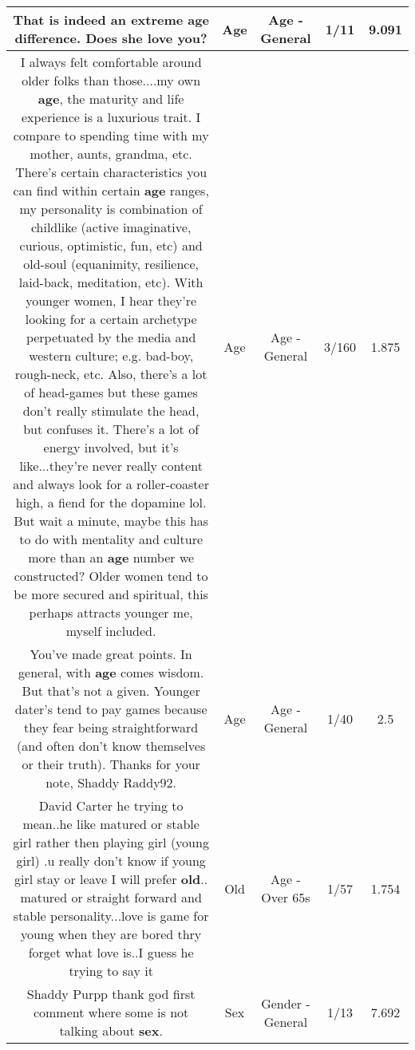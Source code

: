 \documentclass[11pt]{article}
\newlength\mylength
\begin{document}
\begin{center}
\begin{longtable}{|C{.65\mylength}|C{.30\mylength}|C{.12\mylength}|C{.12\mylength}|C{.12\mylength}|}
  \small That is indeed an extreme \textbf{age} difference. Does she love you?\normalsize   & Age & Age - General & 1/11 & 9.091 \\  \hline
  \small I always felt comfortable around older folks than those....my own \textbf{age}, the maturity and life experience is a luxurious trait. I compare to spending time with my mother,  aunts, grandma, etc. There's certain characteristics you can find within certain \textbf{age} ranges, my personality is combination of childlike (active imaginative, curious, optimistic, fun, etc) and old-soul (equanimity, resilience, laid-back,  meditation, etc). With younger women, I hear they're looking for a certain archetype perpetuated by the media and western culture; e.g. bad-boy, rough-neck, etc. Also, there's a lot of head-games but these games don't really stimulate the head, but confuses it. There's a lot of energy involved, but it's like...they're never really content and always look for a roller-coaster high, a fiend for the dopamine lol. But wait a minute, maybe this has to do with mentality and culture more than an \textbf{age} number we constructed? Older women tend to be more secured and spiritual, this perhaps attracts younger me, myself included.\normalsize   & Age & Age - General & 3/160 & 1.875 \\  \hline
  \small You've made great points. In general, with \textbf{age} comes wisdom. But that's not a given. Younger dater's tend to pay games because they fear being straightforward (and often don't know themselves or their truth). Thanks for your note, Shaddy Raddy92.\normalsize   & Age & Age - General & 1/40 & 2.5 \\  \hline
  \small David Carter he trying to mean..he like matured or stable girl rather then playing girl (young girl) .u really don't know if young girl stay or leave I will prefer \textbf{old}.. matured or straight forward and stable personality...love is game for young when they are bored thry forget what love is..I guess he trying to say it\normalsize   & Old & Age - Over 65s & 1/57 & 1.754 \\  \hline
  \small Shaddy Purpp thank god first comment where some is not talking about \textbf{sex}.\normalsize   & Sex & Gender - General & 1/13 & 7.692 \\  \hline

\end{longtable}
\end{center}
\end{document}
